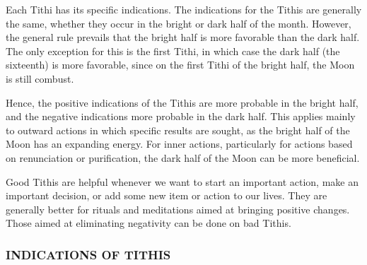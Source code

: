 Each Tithi has its specific indications. The indications for the Tithis are generally the same, whether they occur in the bright or dark half of the month. However, the general rule prevails that the bright half is more favorable than the dark half. The only exception for this is the first Tithi, in which case the dark half (the sixteenth) is more favorable, since on the first Tithi of the bright half, the Moon is still combust.

 

Hence, the positive indications of the Tithis are more probable in the bright half, and the negative indications more probable in the dark half. This applies mainly to outward actions in which specific results are sought, as the bright half of the Moon has an expanding energy. For inner actions, particularly for actions based on renunciation or purification, the dark half of the Moon can be more beneficial.

 

Good Tithis are helpful whenever we want to start an important action, make an important decision, or add some new item or action to our lives. They are generally better for rituals and meditations aimed at bringing positive changes. Those aimed at eliminating negativity can be done on bad Tithis.

 

\subsubsection{INDICATIONS OF TITHIS}




